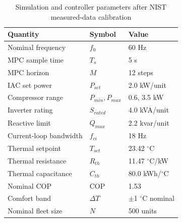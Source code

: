 \begin{table}[!t]
\caption{Simulation and controller parameters after NIST measured-data calibration}
\label{tab:parameters}
\centering
\begin{tabular}{lll}
\toprule
Quantity & Symbol & Value \\
\midrule
Nominal frequency & $f_0$ & 60 Hz \\
MPC sample time & $T_s$ & 5 s \\
MPC horizon & $M$ & 12 steps \\
IAC set power & $P_{set}$ & 2.0 kW/unit \\
Compressor range & $P_{min},P_{max}$ & 0.6, 3.5 kW \\
Inverter rating & $S_{rated}$ & 4.0 kVA/unit \\
Reactive limit & $Q_{max}$ & 2.2 kvar/unit \\
Current-loop bandwidth & $f_{ci}$ & 18 Hz \\
Thermal setpoint & $T_{set}$ & 23.42 $^\circ$C \\
Thermal resistance & $R_{th}$ & 11.47 $^\circ$C/kW \\
Thermal capacitance & $C_{th}$ & 80.0 kWh/$^\circ$C \\
Nominal COP & COP & 1.53 \\
Comfort band & $\Delta T$ & $\pm$1 $^\circ$C nominal \\
Nominal fleet size & $N$ & 500 units \\
\bottomrule
\end{tabular}
\end{table}
